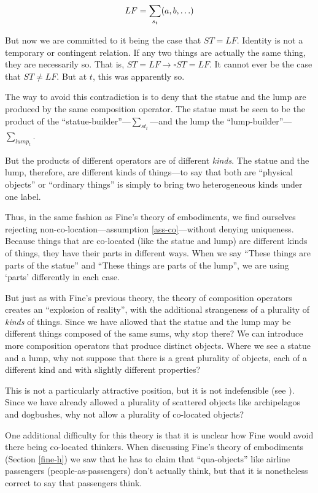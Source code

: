 \documentclass[12pt,twoside]{reedfancy}
\begin{document}
\begin{spacing}{1.25}
\begin{displaymath}
LF = \sum_{s_t} (a, b, \mathellipsis )
\end{displaymath}

But now we are committed to it being the case that $ST = LF$.
Identity is not a temporary or contingent relation.  If any two things
are actually the same thing, they are necessarily so.  That is, $ST =
LF \rightarrow \square ST = LF$.  It cannot ever be the case that $ST
\neq LF$.  But at $t$, this was apparently so.

The way to avoid this contradiction is to deny that the statue and the
lump are produced by the same composition operator.  The statue must
be seen to be the product of the ``statue-builder''---$\sum
_{st_t}$---and the lump the ``lump-builder''---$\sum _{lump_t}$.

But the products of different operators are of different {\em kinds}.
The statue and the lump, therefore, are different kinds of things---to
say that both are ``physical objects'' or ``ordinary things'' is
simply to bring two heterogeneous kinds under one label.

Thus, in the same fashion as Fine's theory of embodiments, we find
ourselves rejecting non-co-location---assumption
\ref{ass-co}---without denying uniqueness.  Because things that are
co-located (like the statue and lump) are different kinds of things,
they have their parts in different ways.  When we say ``These things
are parts of the statue'' and ``These things are parts of the lump'',
we are using `parts' differently in each case.

But just as with Fine's previous theory, the theory of composition
operators creates an ``explosion of reality'', with the additional
strangeness of a plurality of {\em kinds} of things.  Since we have
allowed that the statue and the lump may be different things composed
of the same sums, why stop there?  We can introduce more composition
operators that produce distinct objects.  Where we see a statue and a
lump, why not suppose that there is a great plurality of objects, each
of a different kind and with slightly different properties?

This is not a particularly attractive position, but it is not
indefensible (see \citet[Section 4]{bennett2004}).  Since we have
already allowed a plurality of scattered objects like archipelagos and
dogbushes, why not allow a plurality of co-located objects?

One additional difficulty for this theory is that it is unclear how
Fine would avoid there being co-located thinkers.  When discussing
Fine's theory of embodiments (Section \ref{fine-h}) we saw that he has
to claim that ``qua-objects'' like airline passengers
(people-as-passengers) don't actually think, but that it is
nonetheless correct to say that passengers think.


\end{spacing}
\end{document}
